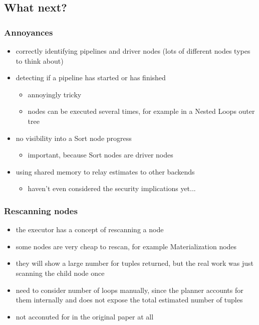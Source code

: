 \documentclass{beamer}
\begin{document}
\subsection{What next?}

\begin{frame}
  \frametitle{Annoyances}

  \begin{itemize}
  \item correctly identifying pipelines and driver nodes (lots of different
    nodes types to think about)
  \item detecting if a pipeline has started or has finished
    \begin{itemize}
    \item annoyingly tricky
    \item nodes can be executed several times, for example in a Nested Loops
      outer tree
    \end{itemize}
  \item no visibility into a Sort node progress
    \begin{itemize}
    \item important, because Sort nodes are driver nodes
    \end{itemize}
  \item using shared memory to relay estimates to other backends
    \begin{itemize}
    \item haven't even considered the security implications yet...
    \end{itemize}
  \end{itemize}
\end{frame}

\begin{frame}
  \frametitle{Rescanning nodes}

  \begin{itemize}
  \item the executor has a concept of rescanning a node
  \item some nodes are very cheap to rescan, for example Materialization nodes
  \item they will show a large number for tuples returned, but the real work
    was just scanning the child node once
  \item need to consider number of loops manually, since the planner accounts
    for them internally and does not expose the total estimated number of
    tuples
  \item not acconuted for in the original paper at all
  \end{itemize}
\end{frame}
\end{document}
